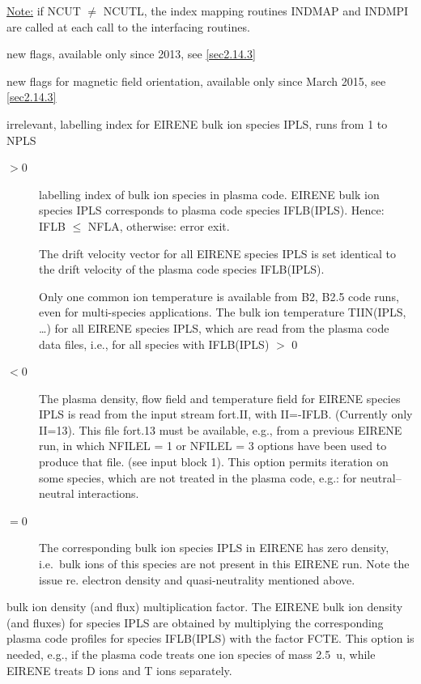 \begin{description}
        \underline{Note:} if NCUT $\ne$ NCUTL, the index mapping routines INDMAP and
        INDMPI are called at each call to the interfacing routines.

  \item[MSHFRM, NTRFRM, NFULL] new flags, available only since 2013, see
        \cref{sec2.14.3}
  \item[IBRAD, IBPOL, IBTOR] new flags for magnetic field
        orientation, available only since March 2015, see \cref{sec2.14.3}
  \item[I]
        irrelevant, labelling index for EIRENE bulk ion species IPLS, runs from 1 to
        NPLS
  \item[IFLB]
        \begin{description}
          \item[$> 0$] labelling index of bulk ion
                species in plasma code.
                EIRENE bulk ion species IPLS corresponds to plasma code species IFLB(IPLS).
                Hence:
                IFLB $\le$ NFLA, otherwise: error exit.

                The drift velocity vector for all EIRENE species IPLS is set identical to the
                drift velocity of the plasma code species IFLB(IPLS).

                Only one common ion temperature is available from B2, B2.5 code runs, even for
                multi-species applications.
                The bulk ion temperature TIIN(IPLS, \dots) for all EIRENE species IPLS, which
                are read from the plasma code data files, i.e., for all species with IFLB(IPLS)
                $>$ 0
          \item[$< 0$] The plasma density, flow field and temperature field for
                EIRENE species IPLS is read from the input stream fort.II, with II=-IFLB.
                (Currently only II=13).
                This file fort.13 must be available, e.g., from a previous EIRENE run, in which
                NFILEL = 1 or NFILEL = 3 options have been used to produce that file.
                (see input block 1).
                This option permits iteration on some species, which are not treated in the
                plasma code, e.g.: for neutral--neutral interactions.
          \item[$= 0$] The corresponding bulk ion species IPLS in EIRENE has zero
                density, i.e.\ bulk ions of this species are not present in this EIRENE run.
                Note the issue re.
                electron density and quasi-neutrality mentioned
                above.
        \end{description}
  \item[FCTE] bulk ion density (and flux) multiplication factor.
        The EIRENE bulk ion density (and fluxes) for species IPLS are obtained by
        multiplying the corresponding plasma code profiles for species IFLB(IPLS) with
        the factor FCTE.
        This option is needed, e.g., if the plasma code treats one ion species of mass
        \SI{2.5}{\atomicmassunit}, while EIRENE treats D ions and T ions separately.


\end{description}
